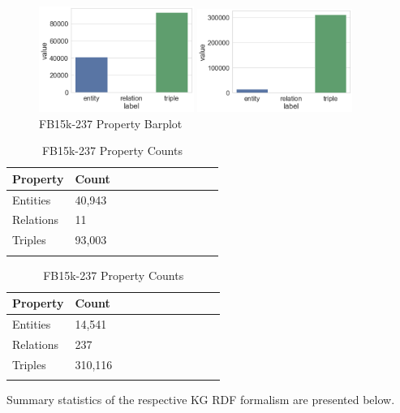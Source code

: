 \begin{figure}[H]
	\parbox{.5\linewidth}{
   		\centering
    		\includegraphics[width=0.45\textwidth]{WN18RR_Counts}
		\caption{WN18RR Property Barplot}
		}
	\hfill
	\parbox{.5\linewidth}{
   		\centering
    		\includegraphics[width=0.45\textwidth]{FB15k-237_Counts}
		\caption{FB15k-237 Property Barplot}
		}
\end{figure}

\begin{table}[H]
	\parbox{.5\linewidth}{
		\centering
		\begin{tabular}{lllllllllll}
  			\textbf{Property} & \textbf{Count}  \\
  			\hline
  			Entities & 40,943  \\
  			Relations & 11  \\
  			Triples & 93,003 \\
			&
		\end{tabular}
		\caption{WN18RR Property Counts}
		}
	\hfill
	\parbox{.5\linewidth}{
		\centering
		\begin{tabular}{lllllllllll}
  			\textbf{Property} & \textbf{Count}  \\
  			\hline
  			Entities & 14,541   \\
  			Relations & 237  \\
  			Triples & 310,116  \\
			&
		\end{tabular}
		\caption{FB15k-237 Property Counts}
		}
\end{table}


\noindent Summary statistics of the respective KG RDF formalism are presented below.

